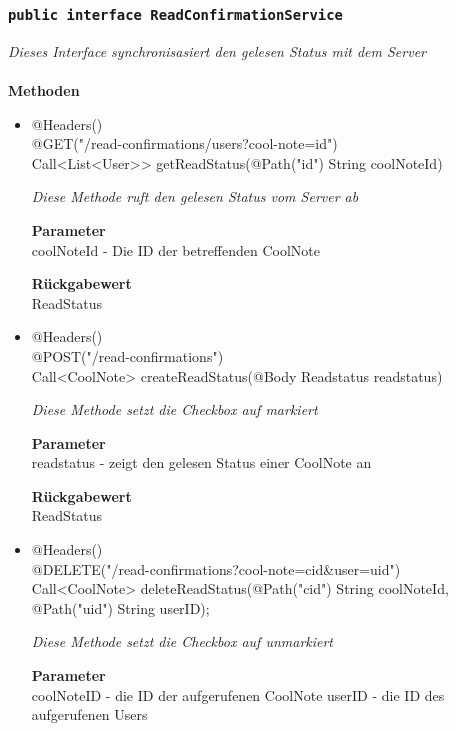 	\subsubsection{\texttt{public interface  ReadConfirmationService }}
\textit{ Dieses Interface synchronisasiert den gelesen Status mit dem Server}\\
\\
	\textbf{Methoden} \\

    \begin{itemize}
		\item{@Headers()\\@GET("/read-confirmations/users?cool-note={id}") \\ Call<List<User>> getReadStatus(@Path("id") String coolNoteId)}

		\textit{Diese Methode ruft den gelesen Status vom Server ab}

		\textbf{Parameter} \\
	 coolNoteId - Die ID der betreffenden CoolNote

		\textbf{Rückgabewert} \\
	ReadStatus

	\item{@Headers()\\ @POST("/read-confirmations") \\ Call<CoolNote> createReadStatus(@Body Readstatus readstatus) } 

		\textit{Diese Methode setzt die Checkbox auf markiert}

		\textbf{Parameter} \\
	 readstatus - zeigt den gelesen Status einer CoolNote an

		\textbf{Rückgabewert} \\
	ReadStatus



	\item{@Headers()\\ @DELETE("/read-confirmations?cool-note={cid}\&user={uid}")}
\\Call<CoolNote> deleteReadStatus(@Path("cid") String coolNoteId,
			     @Path("uid") String userID);

		\textit{Diese Methode setzt die Checkbox auf unmarkiert}

		\textbf{Parameter} \\
	coolNoteID - die ID der aufgerufenen CoolNote
	userID - die ID des aufgerufenen Users



	 \end{itemize}


